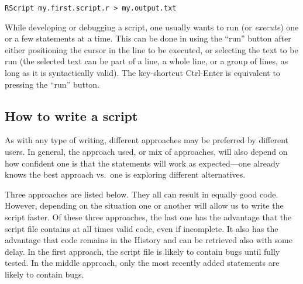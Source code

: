 \begin{playground}
\begin{shaded}
\footnotesize
\begin{verbatim}
RScript my.first.script.r > my.output.txt
\end{verbatim}
\end{shaded}

While developing or debugging a script, one usually wants to run (or \emph{execute}) one or a few statements at a time. This can be done in \RStudio using the ``run'' button after either positioning the cursor in the line to be executed, or selecting the text to be run (the selected text can be part of a line, a whole line, or a group of lines, as long as it is syntactically valid). The key-shortcut Ctrl-Enter is equivalent to pressing the ``run'' button.

\subsection{How to write a script}\label{sec:script:writing}

As with any type of writing, different approaches may be preferred by different \Rlang users. In general, the approach used, or mix of approaches, will also depend on how confident one is that the statements will work as expected---one already knows the best approach vs.\ one is exploring different alternatives.

Three approaches are listed below. They all can result in equally good code. However, depending on the situation one or another will allow us to write the script faster. Of these three approaches, the last one has the advantage that the script file contains at all times valid \Rlang code, even if incomplete.  It also has the advantage that code remains in the History and can be retrieved also with some delay. In the first approach, the script file is likely to contain bugs until fully tested. In the middle approach, only the most recently added statements are likely to contain bugs.


\end{playground}
